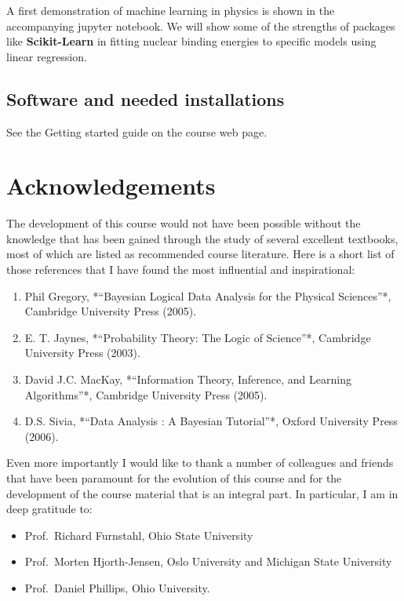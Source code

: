 \documentclass[%
oneside,                 %
final,                   %
10pt]{article}
\begin{document}
A first demonstration of machine learning in physics is shown in the accompanying jupyter notebook. We will show some of the strengths of packages like \textbf{Scikit-Learn} in fitting nuclear binding energies to specific models using linear regression.

\subsection{Software and needed installations}

See the Getting started guide on the course web page.

\section{Acknowledgements}

The development of this course would not have been possible without the knowledge that has been gained through the study of several excellent textbooks, most of which are listed as recommended course literature. Here is a short list of those references that I have found the most influential and inspirational:

\begin{enumerate}
\item Phil Gregory, *``Bayesian Logical Data Analysis for the Physical Sciences''*, Cambridge University Press (2005).

\item E. T. Jaynes, *``Probability Theory: The Logic of Science''*, Cambridge University Press (2003).

\item David J.C. MacKay, *``Information Theory, Inference, and Learning Algorithms''*, Cambridge University Press (2005).

\item D.S. Sivia, *``Data Analysis : A Bayesian Tutorial''*, Oxford University Press (2006).
\end{enumerate}

\noindent
Even more importantly I would like to thank a number of colleagues and friends that have been paramount for the evolution of this course and for the
development of the course material that is an integral part. In particular, I am in deep gratitude to:

\begin{itemize}
\item Prof.~Richard Furnstahl, Ohio State University

\item Prof.~Morten Hjorth-Jensen, Oslo University and Michigan State University

\item Prof.~Daniel Phillips, Ohio University.
\end{itemize}
\end{document}
